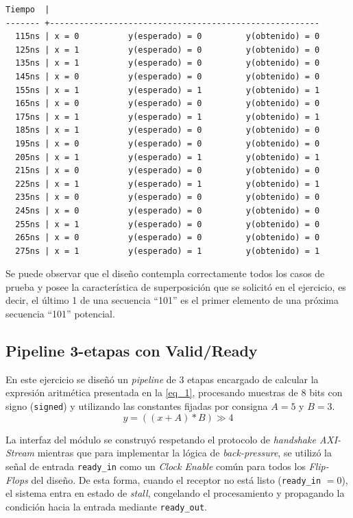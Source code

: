 \documentclass[12pt,a4paper]{article}
\begin{document}
\begin{verbatim}
Tiempo  |                                                   
------- +-------------------------------------------------------
  115ns | x = 0          y(esperado) = 0         y(obtenido) = 0
  125ns | x = 1          y(esperado) = 0         y(obtenido) = 0
  135ns | x = 1          y(esperado) = 0         y(obtenido) = 0
  145ns | x = 0          y(esperado) = 0         y(obtenido) = 0
  155ns | x = 1          y(esperado) = 1         y(obtenido) = 1
  165ns | x = 0          y(esperado) = 0         y(obtenido) = 0
  175ns | x = 1          y(esperado) = 1         y(obtenido) = 1
  185ns | x = 1          y(esperado) = 0         y(obtenido) = 0
  195ns | x = 0          y(esperado) = 0         y(obtenido) = 0
  205ns | x = 1          y(esperado) = 1         y(obtenido) = 1
  215ns | x = 0          y(esperado) = 0         y(obtenido) = 0
  225ns | x = 1          y(esperado) = 1         y(obtenido) = 1
  235ns | x = 0          y(esperado) = 0         y(obtenido) = 0
  245ns | x = 0          y(esperado) = 0         y(obtenido) = 0
  255ns | x = 1          y(esperado) = 0         y(obtenido) = 0
  265ns | x = 0          y(esperado) = 0         y(obtenido) = 0
  275ns | x = 1          y(esperado) = 1         y(obtenido) = 1
\end{verbatim}

Se puede observar que el diseño contempla correctamente todos los casos de prueba y posee la característica de superposición que se solicitó en el ejercicio, es decir, el último 1 de una secuencia ``101'' es el primer elemento de una próxima secuencia ``101'' potencial.


\subsection{Pipeline 3-etapas con Valid/Ready}                      \label{sec_2.5}
En este ejercicio se diseñó un \textit{pipeline} de $3$ etapas encargado de calcular la expresión aritmética presentada en la \autoref{eq_1}, procesando muestras de $8$ bits con signo (\texttt{signed}) y utilizando las constantes fijadas por consigna $A = 5$ y $B = 3$. 
\begin{equation}
    y = ((x + A) \ast B) \gg 4
    \label{eq_1}
\end{equation}

La interfaz del módulo se construyó respetando el protocolo de \textit{handshake AXI-Stream} mientras que para implementar la lógica de \textit{back-pressure}, se utilizó la señal de entrada \texttt{ready\_in} como un \textit{Clock Enable} común para todos los \textit{Flip-Flops} del diseño. De esta forma, cuando el receptor no está listo (\texttt{ready\_in} $= 0$), el sistema entra en estado de \textit{stall}, congelando el procesamiento y propagando la condición hacia la entrada mediante \texttt{ready\_out}.
\end{document}
